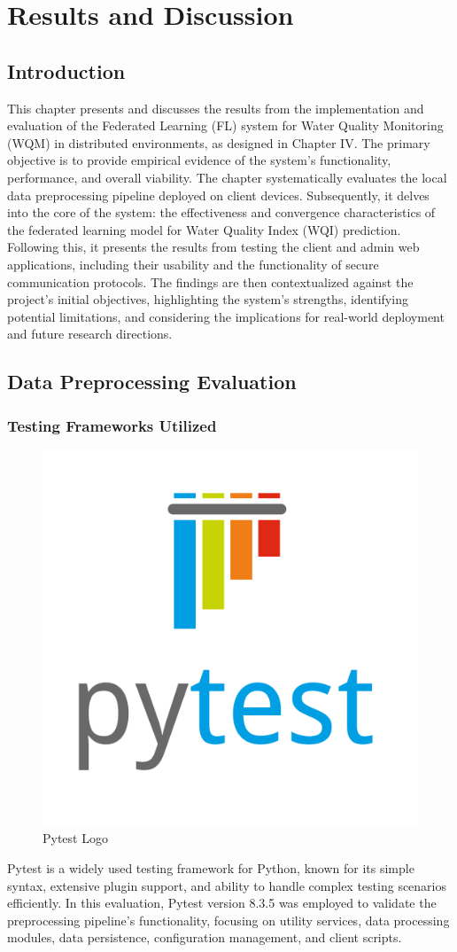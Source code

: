 \chapter{Results and Discussion}
\label{chap:results}
\section*{Introduction}
This chapter presents and discusses the results from the implementation and evaluation of the Federated Learning (FL) system for Water Quality Monitoring (WQM) in distributed environments, as designed in Chapter IV. The primary objective is to provide empirical evidence of the system's functionality, performance, and overall viability. The chapter systematically evaluates the local data preprocessing pipeline deployed on client devices. Subsequently, it delves into the core of the system: the effectiveness and convergence characteristics of the federated learning model for Water Quality Index (WQI) prediction. Following this, it presents the results from testing the client and admin web applications, including their usability and the functionality of secure communication protocols. The findings are then contextualized against the project's initial objectives, highlighting the system's strengths, identifying potential limitations, and considering the implications for real-world deployment and future research directions.

\newpage

\section{Data Preprocessing Evaluation}
\subsection{Testing Frameworks Utilized}

\begin{figure}[h]
    \centering
    \includegraphics[width=0.15\linewidth]{Figures/pytest.png}
    \caption{Pytest Logo}
    \label{fig:enter-label}
\end{figure}
Pytest is a widely used testing framework for Python, known for its simple syntax, extensive plugin support, and ability to handle complex testing scenarios efficiently. In this evaluation, Pytest version 8.3.5 was employed to validate the preprocessing pipeline’s functionality, focusing on utility services, data processing modules, data persistence, configuration management, and client scripts.


